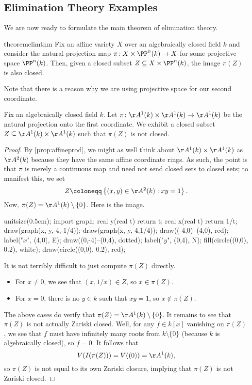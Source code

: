 \subsection{Elimination Theory Examples}
We are now ready to formulate the main theorem of elimination theory.
\begin{restatable}{theorem}{elimthm} \label{thm:elim}
	Fix an affine variety $X$ over an algebraically closed field $k$ and consider the natural projection map $\pi\colon X\times\PP^n(k)\to X$ for some projective space $\PP^n(k)$. Then, given a closed subset $Z\subseteq X\times\PP^n(k)$, the image $\pi (Z)$ is also closed.
\end{restatable}
Note that there is a reason why we are using projective space for our second coordinate.
\begin{exe} \label{exe:elimnex}
	Fix an algebraically closed field $k$. Let $\pi\colon\AA^1(k)\times\AA^1(k)\to\AA^1(k)$ be the natural projection onto the first coordinate. We exhibit a closed subset $Z\subseteq\AA^1(k)\times\AA^1(k)$ such that $\pi(Z)$ is not closed.
\end{exe}
\begin{proof}
	By \autoref{prop:affineprod}, we might as well think about $\AA^1(k)\times\AA^1(k)$ as $\AA^2(k)$ because they have the same affine coordinate rings. As such, the point is that $\pi$ is merely a continuous map and need not send closed sets to closed sets; to manifest this, we set
	\[Z\coloneqq\left\{(x,y)\in\AA^2(k):xy=1\right\}.\]
	Now, $\pi(Z)=\AA^1(k)\setminus\{0\}$. Here is the image.
	\begin{center}
		\begin{asy}
			unitsize(0.5cm);
			import graph;
			real y(real t)
			{
				return t;
			}
			real x(real t)
			{
				return 1/t;
			}
			draw(graph(x, y,-4,-1/4));
			draw(graph(x, y, 4,1/4));
			draw((-4,0)--(4,0), red); label("$x$", (4,0), E);
			draw((0,-4)--(0,4), dotted); label("$y$", (0,4), N);
			fill(circle((0,0), 0.2), white);
			draw(circle((0,0), 0.2), red);
		\end{asy}
	\end{center}
	It is not terribly difficult to just compute $\pi\left(Z\right)$ directly.
	\begin{itemize}
		\item For $x\ne0$, we see that $(x,1/x)\in Z$, so $x\in\pi(Z)$.
		\item For $x=0$, there is no $y\in k$ such that $xy=1$, so $x\notin\pi(Z)$.
	\end{itemize}
	The above cases do verify that $\pi(Z)=\AA^1(k)\setminus\{0\}$. It remains to see that $\pi(Z)$ is not actually Zariski closed. Well, for any $f\in k[x]$ vanishing on $\pi(Z)$, we see that $f$ must have infinitely many roots from $k\setminus\{0\}$ (because $k$ is algebraically closed), so $f=0$. It follows that
	\[V(I(\pi(Z)))=V((0))=\AA^1(k),\]
	so $\pi(Z)$ is not equal to its own Zariski closure, implying that $\pi(Z)$ is not Zariski closed.
\end{proof}
